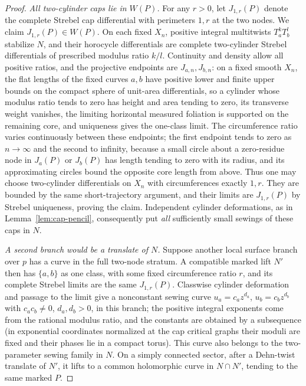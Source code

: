 \documentclass[12pt]{article}
\theoremstyle{remark}
\begin{document}
\begin{proof}
\emph{All two-cylinder caps lie in \(W(P)\).}
For any \(r>0\), let \(J_{1,r}(P)\) denote the complete
Strebel cap differential with perimeters \(1,r\) at the two
nodes. We claim \(J_{1,r}(P)\in W(P)\).
On each fixed \(X_n\), positive integral multitwists
\(T_a^kT_b^l\) stabilize \(N\), and their horocycle differentials
\cite[Lemmas 2.4--2.5]{AHW} are complete two-cylinder
Strebel differentials of prescribed modulus ratio \(k/l\).
Continuity and density allow all positive ratios, and the
projective endpoints are \(J_{a,n},J_{b,n}\): on a fixed
smooth \(X_n\), the flat lengths of the fixed curves \(a,b\) have
positive lower and finite upper bounds on the compact sphere of
unit-area differentials, so a cylinder whose modulus ratio tends
to zero has height and area tending to zero, its transverse weight
vanishes, the limiting horizontal measured foliation is
supported on the remaining core, and uniqueness gives the
one-class limit.
The circumference ratio varies continuously between these
endpoints; the first endpoint tends to zero as \(n\to\infty\)
and the second to infinity, because a small
circle about a zero-residue node in \(J_a(P)\) or \(J_b(P)\)
has length tending to zero with its radius, and its approximating
circles bound the opposite core length from above.
Thus one may choose two-cylinder differentials on \(X_n\)
with circumferences exactly \(1,r\). They are bounded by the same
short-trajectory argument, and their limits are \(J_{1,r}(P)\) by
Strebel uniqueness, proving the claim. Independent cylinder
deformations, as in Lemma~\ref{lem:cap-pencil}, consequently put
\emph{all} sufficiently small sewings of these caps in \(N\).

\emph{A second branch would be a translate of \(N\).}
Suppose another local surface branch over \(p\) has a curve
in the full two-node stratum. A compatible marked lift
\(N'\) then has \(\{a,b\}\) as one class, with some fixed
circumference ratio \(r\), and its complete Strebel limits are
the same \(J_{1,r}(P)\).
Classwise cylinder deformation and passage to the limit
give a nonconstant sewing curve
\(u_a=c_a z^{d_a}\), \(u_b=c_b z^{d_b}\) with \(c_a c_b\ne0\),
\(d_a,d_b>0\), in this branch; the positive integral exponents come
from the rational modulus ratio, and the constants are obtained
by a subsequence (in exponential coordinates normalized
at the cap critical graphs their moduli are fixed and
their phases lie in a compact torus).
This curve also belongs to the two-parameter sewing family
in \(N\). On a simply connected sector, after a Dehn-twist
translate of \(N'\), it lifts to a common holomorphic curve
in \(N\cap N'\), tending to the same marked \(P\).


\end{proof}
\end{document}

